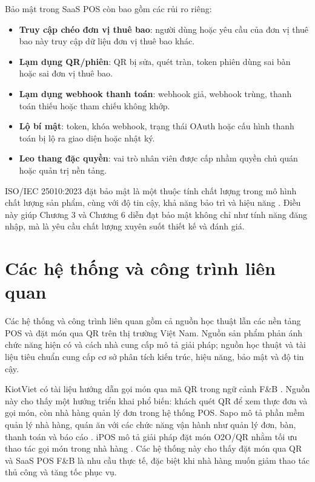 Bảo mật trong SaaS POS còn bao gồm các rủi ro riêng:

\begin{itemize}
  \item \textbf{Truy cập chéo đơn vị thuê bao}: người dùng hoặc yêu cầu của đơn vị thuê bao này truy cập dữ liệu đơn vị thuê bao khác.
  \item \textbf{Lạm dụng QR/phiên}: QR bị sửa, quét tràn, token phiên dùng sai bàn hoặc sai đơn vị thuê bao.
  \item \textbf{Lạm dụng webhook thanh toán}: webhook giả, webhook trùng, thanh toán thiếu hoặc tham chiếu không khớp.
  \item \textbf{Lộ bí mật}: token, khóa webhook, trạng thái OAuth hoặc cấu hình thanh toán bị lộ ra giao diện hoặc nhật ký.
  \item \textbf{Leo thang đặc quyền}: vai trò nhân viên được cấp nhầm quyền chủ quán hoặc quản trị nền tảng.
\end{itemize}

ISO/IEC 25010:2023 đặt bảo mật là một thuộc tính chất lượng trong mô hình chất lượng sản phẩm, cùng với độ tin cậy, khả năng bảo trì và hiệu năng \cite{iso-iec-25010-2023}. Điều này giúp Chương 3 và Chương 6 diễn đạt bảo mật không chỉ như tính năng đăng nhập, mà là yêu cầu chất lượng xuyên suốt thiết kế và đánh giá.

\section{Các hệ thống và công trình liên quan}

Các hệ thống và công trình liên quan gồm cả nguồn học thuật lẫn các nền tảng POS và đặt món qua QR trên thị trường Việt Nam. Nguồn sản phẩm phản ánh chức năng hiện có và cách nhà cung cấp mô tả giải pháp; nguồn học thuật và tài liệu tiêu chuẩn cung cấp cơ sở phân tích kiến trúc, hiệu năng, bảo mật và độ tin cậy.

KiotViet có tài liệu hướng dẫn gọi món qua mã QR trong ngữ cảnh F\&B \cite{kiotviet-qr-order-doc}. Nguồn này cho thấy một hướng triển khai phổ biến: khách quét QR để xem thực đơn và gọi món, còn nhà hàng quản lý đơn trong hệ thống POS. Sapo mô tả phần mềm quản lý nhà hàng, quán ăn với các chức năng vận hành như quản lý đơn, bàn, thanh toán và báo cáo \cite{sapo-fnb-restaurant-pos}. iPOS mô tả giải pháp đặt món O2O/QR nhằm tối ưu thao tác gọi món trong nhà hàng \cite{ipos-o2o-qr-order}. Các hệ thống này cho thấy đặt món qua QR và SaaS POS F\&B là nhu cầu thực tế, đặc biệt khi nhà hàng muốn giảm thao tác thủ công và tăng tốc phục vụ.

